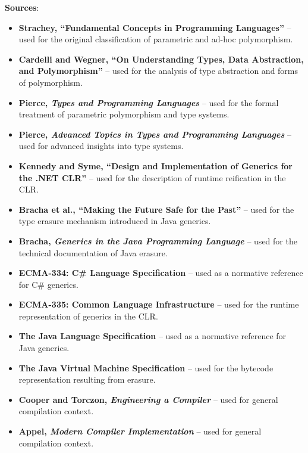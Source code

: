 \documentclass[11pt]{report}
\begin{document}
\vspace{0.5em}
\noindent\textbf{Sources}:
\begin{itemize}
    \item \textbf{Strachey, ``Fundamental Concepts in Programming Languages''} \cite{strachey1967} -- used for the original classification of parametric and ad-hoc polymorphism.
    \item \textbf{Cardelli and Wegner, ``On Understanding Types, Data Abstraction, and Polymorphism''} \cite{cardelli1985} -- used for the analysis of type abstraction and forms of polymorphism.
    \item \textbf{Pierce, \emph{Types and Programming Languages}} \cite{pierce2002} -- used for the formal treatment of parametric polymorphism and type systems.
    \item \textbf{Pierce, \emph{Advanced Topics in Types and Programming Languages}} \cite{pierce2005} -- used for advanced insights into type systems.
    \item \textbf{Kennedy and Syme, ``Design and Implementation of Generics for the .NET CLR''} \cite{kennedy2001} -- used for the description of runtime reification in the CLR.
    \item \textbf{Bracha et al., ``Making the Future Safe for the Past''} \cite{bracha1998} -- used for the type erasure mechanism introduced in Java generics.
    \item \textbf{Bracha, \emph{Generics in the Java Programming Language}} \cite{bracha2004} -- used for the technical documentation of Java erasure.
    \item \textbf{ECMA-334: C\# Language Specification} \cite{ecma334_2023} -- used as a normative reference for C\# generics.
    \item \textbf{ECMA-335: Common Language Infrastructure} \cite{ecma335_2024} -- used for the runtime representation of generics in the CLR.
    \item \textbf{The Java Language Specification} \cite{jls2024} -- used as a normative reference for Java generics.
    \item \textbf{The Java Virtual Machine Specification} \cite{jvms2024} -- used for the bytecode representation resulting from erasure.
    \item \textbf{Cooper and Torczon, \emph{Engineering a Compiler}} \cite{cooper2022} -- used for general compilation context.
    \item \textbf{Appel, \emph{Modern Compiler Implementation}} \cite{appel1998} -- used for general compilation context.

\end{itemize}
\end{document}
